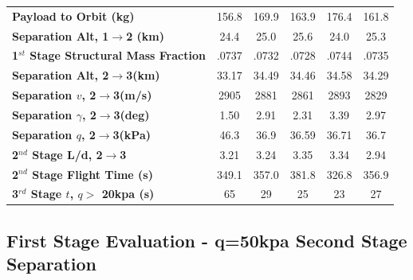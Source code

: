 \documentclass[journal]{new-aiaa}
\newcommand{\FirstStageAltConstq}{24.4}
\newcommand{\FirstStageAltFifty}{25.0}
\newcommand{\FirstStageAltFortyFive}{25.6}
\newcommand{\FirstStageAltFiftyFive}{24.0}
\newcommand{\FirstStageAltHighDrag}{25.3}
\newcommand{\FirstStagesmfConstq}{.0737}
\newcommand{\FirstStagesmfFifty}{.0732}
\newcommand{\FirstStagesmfFortyFive}{.0728}
\newcommand{\FirstStagesmfFiftyFive}{.0744}
\newcommand{\FirstStagesmfHighDrag}{.0735}
\newcommand{\PayloadToOrbitConstq}{156.8}
\newcommand{\PayloadToOrbitFiftykPa}{169.9}
\newcommand{\PayloadToOrbitFortyFivekPa}{163.9}
\newcommand{\PayloadToOrbitFiftyFivekPa}{176.4}
\newcommand{\PayloadToOrbitHighDrag}{161.8}
\newcommand{\SeparationAltConstq}{33.17}
\newcommand{\SeparationAltFiftykPa}{34.49}
\newcommand{\SeparationAltFortyFivekPa}{34.46}
\newcommand{\SeparationAltFiftyFivekPa}{34.58}
\newcommand{\SeparationAltHighDrag}{34.29}
\newcommand{\SeparationvConstq}{2905}
\newcommand{\SeparationvFiftykPa}{2881}
\newcommand{\SeparationvFortyFivekPa}{2861}
\newcommand{\SeparationvFiftyFivekPa}{2893}
\newcommand{\SeparationvHighDrag}{2829}
\newcommand{\SeparationAngleConstq}{1.50}
\newcommand{\SeparationAngleFiftykPa}{2.91}
\newcommand{\SeparationAngleFortyFivekPa}{2.31}
\newcommand{\SeparationAngleFiftyFivekPa}{3.39}
\newcommand{\SeparationAngleHighDrag}{2.97}
\newcommand{\SeparationqConstq}{46.3}
\newcommand{\SeparationqFiftykPa}{36.9}
\newcommand{\SeparationqFortyFivekPa}{36.59}
\newcommand{\SeparationqFiftyFivekPa}{36.71}
\newcommand{\SeparationqHighDrag}{36.7}
\newcommand{\SeparationLDConstq}{3.21}
\newcommand{\SeparationLDFiftykPa}{3.24}
\newcommand{\SeparationLDFortyFivekPa}{3.35}
\newcommand{\SeparationLDFiftyFivekPa}{3.34}
\newcommand{\SeparationLDHighDrag}{2.94}
\newcommand{\FlightTimeConstq}{349.1}
\newcommand{\FlightTimeFiftykPa}{357.0}
\newcommand{\FlightTimeFortyFivekPa}{381.8}
\newcommand{\FlightTimeFiftyFivekPa}{326.8}
\newcommand{\FlightTimeHighDrag}{356.9}
\newcommand{\toverConstq}{65}
\newcommand{\toverFiftykPa}{29}
\newcommand{\toverFortyFivekPa}{25}
\newcommand{\toverFiftyFivekPa}{23}
\newcommand{\toverHighDrag}{27}
\begin{document}
\begin{table}[htb]
\begin{tabular}{l c c c c c}
		\hline \textbf{Payload to Orbit (kg)}  & \PayloadToOrbitConstq & \PayloadToOrbitFiftykPa & \PayloadToOrbitFortyFivekPa & \PayloadToOrbitFiftyFivekPa & \PayloadToOrbitHighDrag \\ 
		\textbf{Separation Alt, 1$\rightarrow$2 (km)}  & \FirstStageAltConstq & \FirstStageAltFifty & \FirstStageAltFortyFive &  \FirstStageAltFiftyFive &\FirstStageAltHighDrag \\ 
		\textbf{1$^{st}$ Stage Structural Mass Fraction} & \FirstStagesmfConstq & \FirstStagesmfFifty &  \FirstStagesmfFortyFive& \FirstStagesmfFiftyFive  & \FirstStagesmfHighDrag\\ 
		 \textbf{Separation Alt, 2$\rightarrow$3(km)}  & \SeparationAltConstq & \SeparationAltFiftykPa & \SeparationAltFortyFivekPa & \SeparationAltFiftyFivekPa & \SeparationAltHighDrag\\ 
		 \textbf{Separation $v$, 2$\rightarrow$3(m/s)} & \SeparationvConstq  & \SeparationvFiftykPa & \SeparationvFortyFivekPa &  \SeparationvFiftyFivekPa & \SeparationvHighDrag\\ 
		 \textbf{Separation $\gamma$, 2$\rightarrow$3(deg)} & \SeparationAngleConstq& \SeparationAngleFiftykPa &\SeparationAngleFortyFivekPa& \SeparationAngleFiftyFivekPa&\SeparationAngleHighDrag \\ 
		 \textbf{Separation $q$, 2$\rightarrow$3(kPa)} & \SeparationqConstq  &\SeparationqFiftykPa&\SeparationqFortyFivekPa &\SeparationqFiftyFivekPa& \SeparationqHighDrag \\ 
		 \textbf{2$^{nd}$ Stage L/d, 2$\rightarrow$3} & \SeparationLDConstq&\SeparationLDFiftykPa & \SeparationLDFortyFivekPa & \SeparationLDFiftyFivekPa &\SeparationLDHighDrag\\
		 \textbf{2$^{nd}$ Stage Flight Time (s)} & \FlightTimeConstq & \FlightTimeFiftykPa & \FlightTimeFortyFivekPa & \FlightTimeFiftyFivekPa & \FlightTimeHighDrag\\ 
		 \textbf{3$^{rd}$ Stage $t$, $q >$ 20kpa (s)} &\toverConstq &\toverFiftykPa &\toverFortyFivekPa &\toverFiftyFivekPa & \toverHighDrag\\ 
		 
		 
		\hline 
	\end{tabular} 


	\label{table:Summary}
\end{table}


\subsection{First Stage Evaluation - q=50kpa Second Stage Separation}
\end{document}
